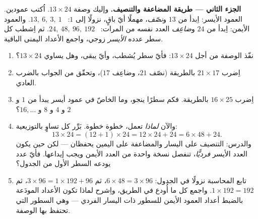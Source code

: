 \begin{problem}
\medskip
\noindent\textbf{الجزء الثاني --- طريقة المضاعفة والتنصيف.}
وإليك وصفة $13 \times 24$. اُكتب عمودين. العمود
الأيسر: اِبدأ من $13$ و\emph{نصّف}، مهملًا أيّ باقٍ،
نزولًا إلى $1$: \ $13,\ 6,\ 3,\ 1$. والعمود الأيمن: اِبدأ من $24$
و\emph{ضاعِف} العدد نفسه من المرات: \ $24,\ 48,\ 96,\ 192$. ثم اِشطب
كل سطر عدده \emph{الأيسر} زوجي، واجمع الأعداد اليمنى
الباقية.
\begin{enumerate}[resume]
  \item نفّذ الوصفة من أجل $13 \times 24$: فأيّ سطر
        يُشطب، وأيّ  يبقى، وهل يساوي
        $13 \times 24$؟
  \item اِضرب $21 \times 17$ بالطريقة (نصّف $21$، وضاعِف
        $17$)، وتحقّق من الجواب بالضرب العادي.
  \item اِضرب $16 \times 25$ بالطريقة. فكم سطرًا
        ينجو، وما الخاصّ في عمود أيسر
        يبدأ من $1$ و $2$ و $4$ و $8$ و $16, \dots$؟
  \item والآن \emph{لماذا} تعمل، خطوة خطوة. بَرِّر كل
        تساوٍ بالتوزيعية:
        \[
        13 \times 24 = (12 + 1) \times 24
        = 12 \times 24 + 24 = 6 \times 48 + 24 .
        \]
        والدرس: التنصيف على اليسار والمضاعفة على اليمين يحفظان
         --- لكن حين يكون العدد الأيسر \emph{فرديًّا}، تنفصل
        نسخة واحدة من العدد الأيمن ويجب إيداعها.
        فأيّ عدد يودعه السطر الأول من الجدول؟
  \item تابع المحاسبة نزولًا في الجدول:
        $6 \times 48 = 3 \times 96$، ثم
        $3 \times 96 = 1 \times 192 + 96$، ثم
        $1 \times 192 = 192$. واجمع كل ما أُودع
        في الطريق، واِشرح لماذا تكون الأعداد المودَعة
        بالضبط أعداد العمود الأيمن للسطور ذات اليسار
        الفردي --- وهي السطور التي تحتفظ بها الوصفة.
\end{enumerate}


\end{problem}
